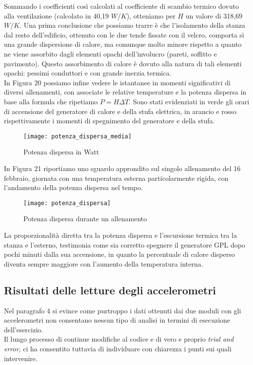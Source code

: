 \documentclass[fleqn,10pt]{SelfArx} %
\begin{document}
Sommando i coefficienti così calcolati al coefficiente di scambio termico dovuto alla ventilazione (calcolato in 40,19 $ W/K $), 
otteniamo per $ H $ un valore di 318,69 $ W/K $.
Una prima conclusione che possiamo trarre è che l'isolamento della stanza dal resto dell'edificio, ottenuto con le due tende 
fissate con il velcro, comporta sì una grande dispersione di calore, ma comunque molto minore rispetto a quanto ne viene 
assorbito dagli elementi opachi dell'involucro (pareti, soffitto e pavimento). Questo assorbimento di calore è dovuto alla natura 
di tali elementi opachi: pessimi conduttori e con grande inerzia termica.\\

In Figura 20 possiamo infine vedere le istantanee in momenti significativi di diversi allenamenti, con associate le relative 
temperature e la potenza dispersa in base alla formula che ripetiamo $ P = H \Delta T $. Sono stati evidenziati in verde gli orari 
di accensione del generatore di calore e della stufa elettrica, in arancio e rosso rispettivamente i momenti di spegnimento del 
generatore e della stufa.

\begin{figure}[htb]\centering
	\texttt{[image: potenza\_dispersa\_media]}
	\caption{Potenza dispersa in Watt}
	\label{fig:potenza media dispersa}
\end{figure}

In Figura 21 riportiamo uno sguardo approndito sul singolo allenamento del 16 febbraio, giornata con una temperatura esterna 
particolarmente rigida, con l'andamento della potenza dispersa nel tempo.

\begin{figure}[htb]\centering
	\texttt{[image: potenza\_dispersa]}
	\caption{Potenza dispersa durante un allenamento}
	\label{fig:potenza dispersa allenamento}
\end{figure}

La proporzionalità diretta tra la potenza dispersa e l'escursione termica tra la stanza e l'esterno, testimonia come sia 
corretto spegnere il generatore GPL dopo pochi minuti dalla sua accensione, in quanto la percentuale di calore disperso diventa 
sempre maggiore con l'aumento della temperatura interna.

\subsection{Risultati delle letture degli accelerometri}
Nel paragrafo 4 si evince come purtroppo i dati ottenuti dai due moduli con gli accelerometri non consentano nessun tipo di 
analisi in termini di esecuzione dell'esercizio.\\
Il lungo processo di continue modifiche al codice e di vero e proprio \textit{trial and error}, ci ha consentito tuttavia 
di individuare con chiarezza i punti sui quali intervenire.\\
\end{document}
